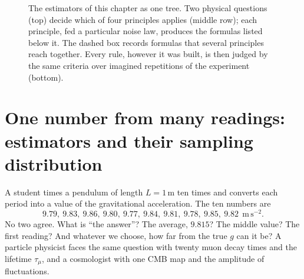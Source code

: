 \begin{figure}[htbp]
\caption{The estimators of this chapter as one tree. Two physical questions (top) decide which of
four principles applies (middle row); each principle, fed a particular noise law, produces the
formulas listed below it. The dashed box records formulas that several principles reach together.
Every rule, however it was built, is then judged by the same criteria over imagined repetitions of
the experiment (bottom).}
\label{3a:fig:estimator-tree}
\end{figure}

\section{One number from many readings: estimators and their sampling distribution}
\label{3a:sec:sampling}

A student times a pendulum of length $L=1\,$m ten times and converts each
period into a value of the gravitational acceleration. The ten numbers are
\[
9.79,\ 9.83,\ 9.86,\ 9.80,\ 9.77,\ 9.84,\ 9.81,\ 9.78,\ 9.85,\ 9.82\ \ \mathrm{m\,s^{-2}}.
\]
No two agree. What is ``the answer''? The average, $9.815$? The middle value?
The first reading? And whatever we choose, how far from the true $g$ can it
be? A particle physicist faces the same question with twenty muon decay times
and the lifetime $\tau_\mu$, and a cosmologist with one CMB map and the
amplitude of fluctuations.

